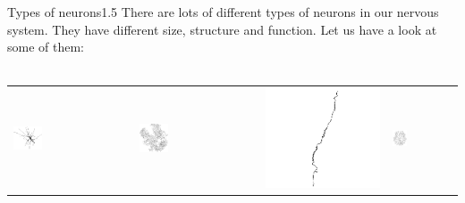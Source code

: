 \documentclass[a4paper,11pt]{article}
\begin{document}
%
%
\begin{exercise}{3}{Types of neurons}{1.5}
There are lots of different types of neurons in our nervous system. They have different size, structure and function. Let us have a look at some of them:\\
\ \\
\begin{tabular}{p{3.7cm} p{3.7cm} p{3.7cm} p{3.7cm}}
\includegraphics[width=0.25\textwidth]{pyramidal2.png} &
\includegraphics[width=0.25\textwidth]{purkinje.png} &
\includegraphics[height=0.25\textwidth]{spindle.png} &
\includegraphics[width=0.25\textwidth]{amacrine.png}\\


\end{tabular}
\end{exercise}
\end{document}
